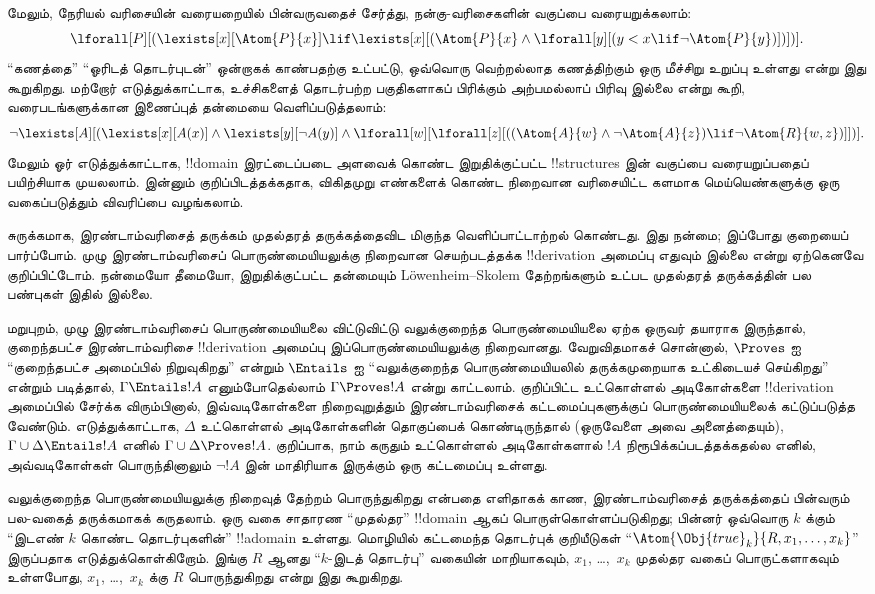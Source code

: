 \documentclass[../../../include/open-logic-section]{subfiles}
\begin{document}
மேலும், நேரியல் வரிசையின் வரையறையில் பின்வருவதைச் சேர்த்து,
நன்கு-வரிசைகளின் வகுப்பை வரையறுக்கலாம்:
\[
\lforall[P][(\lexists[x][\Atom{P}{x}] \lif \lexists[x][(\Atom{P}{x}
    \land \lforall[y][(y < x \lif \lnot \Atom{P}{y})])])].
\]
``கணத்தை'' ``ஓரிடத் தொடர்புடன்'' ஒன்றாகக் காண்பதற்கு உட்பட்டு,
ஒவ்வொரு வெற்றல்லாத கணத்திற்கும் ஒரு மீச்சிறு உறுப்பு உள்ளது என்று இது
கூறுகிறது. மற்றோர் எடுத்துக்காட்டாக, உச்சிகளைத் தொடர்பற்ற பகுதிகளாகப்
பிரிக்கும் அற்பமல்லாப் பிரிவு இல்லை என்று கூறி, வரைபடங்களுக்கான
இணைப்புத் தன்மையை வெளிப்படுத்தலாம்:
\[
\lnot \lexists[A][(\lexists[x][A(x)] \land \lexists[y][\lnot A(y)]
  \land \lforall[w][\lforall[z][((\Atom{A}{w} \land \lnot \Atom{A}{z})
      \lif \lnot \Atom{R}{w,z})]])].
\]
மேலும் ஓர் எடுத்துக்காட்டாக, !!{domain} இரட்டைப்படை அளவைக் கொண்ட
இறுதிக்குட்பட்ட !!{structure}s இன் வகுப்பை வரையறுப்பதைப் பயிற்சியாக
முயலலாம். இன்னும் குறிப்பிடத்தக்கதாக, விகிதமுறு எண்களைக் கொண்ட நிறைவான
வரிசையிட்ட களமாக மெய்யெண்களுக்கு ஒரு வகைப்படுத்தும் விவரிப்பை வழங்கலாம்.

சுருக்கமாக, இரண்டாம்வரிசைத் தருக்கம் முதல்தரத் தருக்கத்தைவிட மிகுந்த
வெளிப்பாட்டாற்றல் கொண்டது. இது நன்மை; இப்போது குறையைப் பார்ப்போம்.
முழு இரண்டாம்வரிசைப் பொருண்மையியலுக்கு நிறைவான செயற்படத்தக்க
!!{derivation} அமைப்பு எதுவும் இல்லை என்று ஏற்கெனவே குறிப்பிட்டோம்.
நன்மையோ தீமையோ, இறுதிக்குட்பட்ட தன்மையும் L\"owenheim--Skolem
தேற்றங்களும் உட்பட முதல்தரத் தருக்கத்தின் பல பண்புகள் இதில் இல்லை.

மறுபுறம், முழு இரண்டாம்வரிசைப் பொருண்மையியலை விட்டுவிட்டு வலுக்குறைந்த
பொருண்மையியலை ஏற்க ஒருவர் தயாராக இருந்தால், குறைந்தபட்ச இரண்டாம்வரிசை
!!{derivation} அமைப்பு இப்பொருண்மையியலுக்கு நிறைவானது. வேறுவிதமாகச்
சொன்னால், $\Proves$ ஐ ``குறைந்தபட்ச அமைப்பில் நிறுவுகிறது'' என்றும்
$\Entails$ ஐ ``வலுக்குறைந்த பொருண்மையியலில் தருக்கமுறையாக
உட்கிடையச் செய்கிறது'' என்றும் படித்தால், $\Gamma \Entails !A$
எனும்போதெல்லாம் $\Gamma \Proves !A$ என்று காட்டலாம். குறிப்பிட்ட
உட்கொள்ளல் அடிகோள்களை !!{derivation} அமைப்பில் சேர்க்க விரும்பினால்,
இவ்வடிகோள்களை நிறைவுறுத்தும் இரண்டாம்வரிசைக் கட்டமைப்புகளுக்குப்
பொருண்மையியலைக் கட்டுப்படுத்த வேண்டும். எடுத்துக்காட்டாக, $\Delta$
உட்கொள்ளல் அடிகோள்களின் தொகுப்பைக் கொண்டிருந்தால் (ஒருவேளை அவை
அனைத்தையும்), $\Gamma \cup \Delta \Entails !A$ எனில்
$\Gamma \cup \Delta \Proves !A$. குறிப்பாக, நாம் கருதும் உட்கொள்ளல்
அடிகோள்களால் $!A$ நிரூபிக்கப்படத்தக்கதல்ல எனில், அவ்வடிகோள்கள்
பொருந்தினாலும் $\lnot !A$ இன் மாதிரியாக இருக்கும் ஒரு கட்டமைப்பு உள்ளது.

வலுக்குறைந்த பொருண்மையியலுக்கு நிறைவுத் தேற்றம் பொருந்துகிறது என்பதை
எளிதாகக் காண, இரண்டாம்வரிசைத் தருக்கத்தைப் பின்வரும் பல-வகைத் தருக்கமாகக்
கருதலாம். ஒரு வகை சாதாரண ``முதல்தர'' !!{domain} ஆகப்
பொருள்கொள்ளப்படுகிறது; பின்னர் ஒவ்வொரு $k$ க்கும் ``இடஎண் $k$ கொண்ட
தொடர்புகளின்'' !!a{domain} உள்ளது. மொழியில் கட்டமைந்த தொடர்புக்
குறியீடுகள் ``$\Atom{\Obj{true}_k}{R,x_1,\dots,x_k}$'' இருப்பதாக
எடுத்துக்கொள்கிறோம். இங்கு $R$ ஆனது ``$k$-இடத் தொடர்பு'' வகையின்
மாறியாகவும், $x_1$, \dots,~$x_k$ முதல்தர வகைப் பொருட்களாகவும் உள்ளபோது,
$x_1$, \dots,~$x_k$ க்கு $R$ பொருந்துகிறது என்று இது கூறுகிறது.
\end{document}
